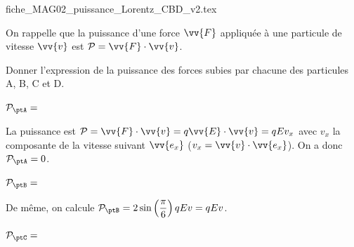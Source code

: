 \begin{center}
{fiche_MAG02_puissance_Lorentz_CBD_v2.tex}
\end{center}

\minusMedskip

On rappelle que la puissance d'une force $\vv{F}$ appliquée à une particule de vitesse $\vv{v}$ est $\mathcal{P}=\vv{F}\cdot\vv{v}$.

Donner l'expression de la puissance des forces subies par chacune des particules A, B, C et D. 

\debutEntrainement



\begin{enonce}
$\mathcal{P}_{\ptA} = $
\end{enonce}

%

\begin{corrige}
La puissance est $\mathcal{P}=\vv{F}\cdot\vv{v}=q\vv{E}\cdot\vv{v}=qEv_{x}$
avec $v_{x}$ la composante de la vitesse suivant $\vv{e_{x}}$ ($v_{x}=\vv{v}\cdot\vv{e_{x}}$).
On a donc $\mathcal{P}_{\ptA}=0$.
\end{corrige}



\begin{enonce}
$\mathcal{P}_{\ptB} = $
\end{enonce}

%

\begin{corrige}
De même, on calcule $\mathcal{P}_{\ptB} =2\sin\left(\dfrac{\pi}{6}\right)qEv =qEv$.
\end{corrige}



\begin{enonce}
$\mathcal{P}_{\ptC} = $
\end{enonce}

